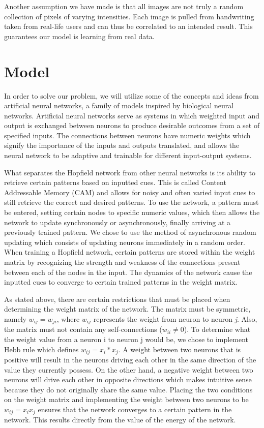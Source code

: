 \documentclass[]{article}
\begin{document}
\hfill \break
	Another assumption we have made is that all images are not truly a random collection of pixels of varying intensities.  Each image is pulled from handwriting taken from real-life users and can thus be correlated to an intended result.  This guarantees our model is learning from real data.


\section{Model}
In order to solve our problem, we will utilize some of the concepts and ideas from artificial neural networks, a family of models inspired by biological neural networks. Artificial neural networks serve as systems in which weighted input and output is exchanged between neurons to produce desirable outcomes from a set of specified inputs. The connections between neurons have numeric weights which signify the importance of the inputs and outputs translated, and allows the neural network to be adaptive and trainable for different input-output systems.

\hfill \break
What separates the Hopfield network from other neural networks is its ability to retrieve certain patterns based on inputted cues. This is called Content Addressable Memory (CAM) and allows for noisy and often varied input cues to still retrieve the correct and desired patterns. To use the network, a pattern must be entered, setting certain nodes to specific numeric values, which then allows the network to update synchronously or asynchronously, finally arriving at a previously trained pattern. We chose to use the method of asynchronous random updating which consists of updating neurons immediately in a random order. When training a Hopfield network, certain patterns are stored within the weight matrix by recognizing the strength and weakness of the connections present between each of the nodes in the input. The dynamics of the network cause the inputted cues to converge to certain trained patterns in the weight matrix.  

\hfill \break
As stated above, there are certain restrictions that must be placed when determining the weight matrix of the network. The matrix must be symmetric, namely \(w_{ij} = w_{ji}\), where \(w_{ij}\) represents the weight from neuron  to neuron \textit{j}. Also, the matrix must not contain any self-connections (\(w_{ii} \neq 0\)). To determine what the weight value from a neuron i to neuron j would be, we chose to implement Hebb rule which defines \(w_{ij} = x_{i} * x_{j}\). A weight between two neurons that is positive will result in the neurons driving each other in the same direction of the value they currently possess. On the other hand, a negative weight between two neurons will drive each other in opposite directions which makes intuitive sense because they do not originally share the same value. Placing the two conditions on the weight matrix and implementing the weight between two neurons to be \(w_{ij} = x_{i}x_{j}\) ensures that the network converges to a certain pattern in the network. This results directly from the value of the energy of the network.
\end{document}
